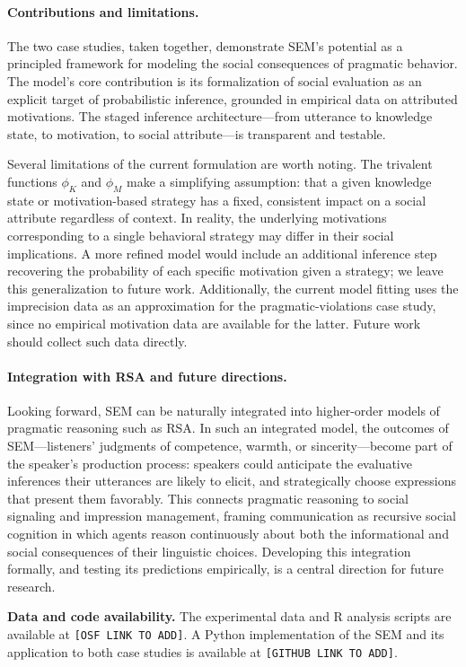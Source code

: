 \documentclass[12pt,a4paper]{article}
\begin{document}
\paragraph{Contributions and limitations.}
The two case studies, taken together, demonstrate SEM's potential as a
principled framework for modeling the social consequences of pragmatic behavior.
The model's core contribution is its formalization of social evaluation as an
explicit target of probabilistic inference, grounded in empirical data on
attributed motivations. The staged inference architecture---from utterance to
knowledge state, to motivation, to social attribute---is transparent and
testable.

Several limitations of the current formulation are worth noting. The trivalent
functions $\phi_K$ and $\phi_M$ make a simplifying assumption: that a given
knowledge state or motivation-based strategy has a fixed, consistent impact on a
social attribute regardless of context. In reality, the underlying motivations
corresponding to a single behavioral strategy may differ in their social
implications. A more refined model would include an additional inference step
recovering the probability of each specific motivation given a strategy; we leave
this generalization to future work. Additionally, the current model fitting uses
the imprecision data as an approximation for the pragmatic-violations case study,
since no empirical motivation data are available for the latter. Future work
should collect such data directly.

\paragraph{Integration with RSA and future directions.}
Looking forward, SEM can be naturally integrated into higher-order models of
pragmatic reasoning such as RSA. In such an integrated model, the outcomes of
SEM---listeners' judgments of competence, warmth, or sincerity---become part of
the speaker's production process: speakers could anticipate the evaluative
inferences their utterances are likely to elicit, and strategically choose
expressions that present them favorably. This connects pragmatic reasoning to
social signaling and impression management, framing communication as recursive
social cognition in which agents reason continuously about both the informational
and social consequences of their linguistic choices. Developing this integration
formally, and testing its predictions empirically, is a central direction for
future research.

\bigskip

\noindent\textbf{Data and code availability.}
The experimental data and R analysis scripts are available at
\texttt{[OSF LINK TO ADD]}. A Python implementation of the SEM and its
application to both case studies is available at \texttt{[GITHUB LINK TO ADD]}.


\printbibliography
\end{document}
